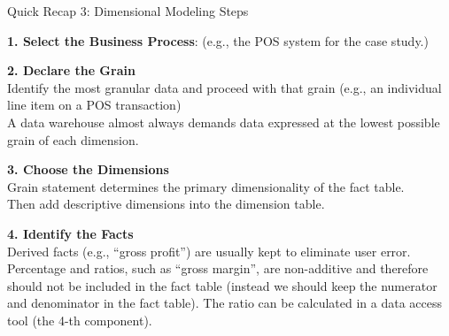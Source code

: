 \begin{frame}[fragile]{Quick Recap 3: Dimensional Modeling Steps}
	\begin{small}
		\textbf{1. Select the Business Process}: (e.g., the POS system for the case study.)\\\vspace{5pt}
		
		\textbf{2. Declare the Grain}\\
		Identify the most granular data and proceed with that grain (e.g., an individual line item on a POS transaction)\\
		A data warehouse almost always demands data expressed at the lowest possible grain of each dimension.
		\\\vspace{5pt}
		
		\textbf{3. Choose the Dimensions}\\
		Grain statement determines the primary dimensionality of the fact table.\\
		Then add descriptive dimensions into the dimension table.\\\vspace{5pt}
		
		\textbf{4. Identify the Facts}\\
		Derived facts (e.g., ``gross profit'') are usually kept to eliminate user error.\\
		Percentage and ratios, such as ``gross margin'', are non-additive and therefore should not be included in the fact table (instead we should keep the numerator and denominator in the fact table). The ratio can be calculated in a data access tool (the 4-th component). 
		
	\end{small}
\end{frame}

